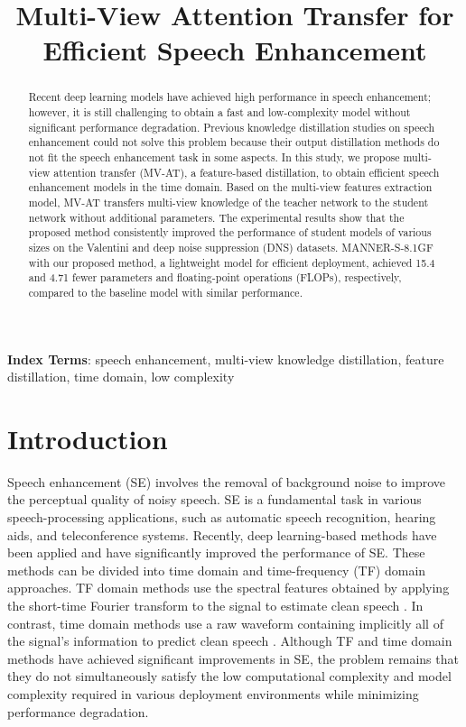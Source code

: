 \documentclass[a4paper]{article}
\title{Multi-View Attention Transfer for Efficient Speech Enhancement}
\begin{document}
\maketitle
\begin{abstract}
Recent deep learning models have achieved high performance in speech enhancement; however, it is still challenging to obtain a fast and low-complexity model without significant performance degradation. Previous knowledge distillation studies on speech enhancement could not solve this problem because their output distillation methods do not fit the speech enhancement task in some aspects. In this study, we propose multi-view attention transfer (MV-AT), a feature-based distillation, to obtain efficient speech enhancement models in the time domain. Based on the multi-view features extraction model, MV-AT transfers multi-view knowledge of the teacher network to the student network without additional parameters. The experimental results show that the proposed method consistently improved the performance of student models of various sizes on the Valentini and deep noise suppression (DNS) datasets. MANNER-S-8.1GF with our proposed method, a lightweight model for efficient deployment, achieved 15.4 and 4.71 fewer parameters and floating-point operations (FLOPs), respectively, compared to the baseline model with similar performance.
\end{abstract}
\noindent\textbf{Index Terms}: speech enhancement, multi-view knowledge distillation, feature distillation, time domain, low complexity
\section{Introduction}

Speech enhancement (SE) involves the removal of background noise to improve the perceptual quality of noisy speech. SE is a fundamental task in various speech-processing applications, such as automatic speech recognition, hearing aids, and teleconference systems. Recently, deep learning-based methods have been applied and have significantly improved the performance of SE. These methods can be divided into time domain and time-frequency (TF) domain approaches. TF domain methods use the spectral features obtained by applying the short-time Fourier transform to the signal to estimate clean speech \cite{tan2018convolutional,yin2020phasen,zheng2020interactive,fu2019metricgan,fu2021metricgan+}. In contrast, time domain methods use a raw waveform containing implicitly all of the signal's information to predict clean speech \cite{park2022manner,defossez2020real,wang2021tstnn,pandey2020dual}. 
Although TF and time domain methods have achieved significant improvements in SE, the problem remains that they do not simultaneously satisfy the low computational complexity and model complexity required in various deployment environments while minimizing performance degradation.
\end{document}
